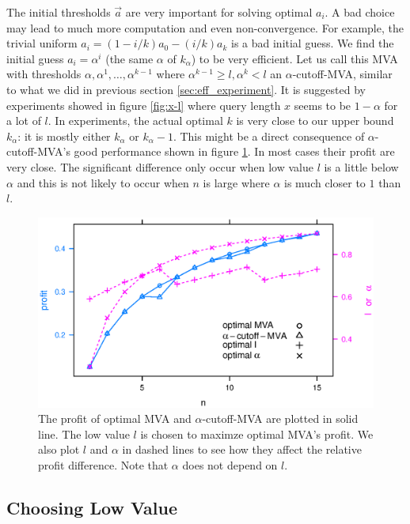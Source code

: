 The initial thresholds $\vec a$ are very important for solving optimal $a_i$. A bad choice may
lead to much more computation and even non-convergence. For example, the
trivial uniform $a_i = (1-i/k)a_0 - (i/k) a_k$ is a bad initial guess. We
find the initial guess $a_i = \alpha^i$ (the same $\alpha$ of $k_\alpha$) to be very efficient.
Let us call this MVA with thresholds $\alpha, \alpha^1, \ldots, \alpha^{k-1}$
where $\alpha^{k-1} \geq l, \alpha^k < l$ an $\alpha$-cutoff-MVA, similar to what we did in
previous section \ref{sec:eff_experiment}.  It is suggested by experiments
showed in figure \ref{fig:x-l} where query length $x$ seems to be $1-\alpha$ for a lot of
$l$. In experiments, the actual optimal $k$ is very close to our upper bound
$k_\alpha$: it is mostly either $k_\alpha$ or $k_\alpha-1$.  This might be a
direct consequence of $\alpha$-cutoff-MVA's good performance shown in figure
\ref{fig:cutoff}. In most cases their profit are very close.
The significant difference only occur when low value $l$ is a little below
$\alpha$ and this is not likely to occur when $n$ is large where $\alpha$ is
much closer to $1$ than $l$.

\begin{figure}
\centering
    \includegraphics[width=\linewidth]{figures/cutoff_.2_.1_15.eps}
    \caption{The profit of optimal MVA and $\alpha$-cutoff-MVA are plotted in
    solid line.  The low value $l$ is chosen to maximze optimal MVA's profit.
    We also plot $l$ and $\alpha$ in dashed lines to see how they affect the
    relative profit difference.  Note that $\alpha$ does not depend on
    $l$.}\label{fig:cutoff}
\end{figure}

\subsection{Choosing Low Value}

